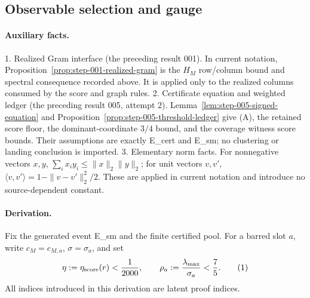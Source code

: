 \subsection{Observable selection and gauge}\label{app:step-006}

\paragraph{Auxiliary facts.}

1. Realized Gram interface (the preceding result 001). In current notation,
   Proposition~\ref{prop:step-001-realized-gram} is the \(H_M\) row/column
   bound and spectral consequence recorded above. It is applied only to the
   realized columns consumed by the score and graph rules.
2. Certificate equation and weighted ledger (the preceding result 005, attempt 2).
   Lemma~\ref{lem:step-005-signed-equation} and
   Proposition~\ref{prop:step-005-threshold-ledger} give (A), the retained
   score floor, the dominant-coordinate \(3/4\) bound, and the coverage
   witness score bounds. Their assumptions are exactly E\_cert and E\_sm; no
   clustering or landing conclusion is imported.
3. Elementary norm facts. For nonnegative vectors \(x,y\),
   \(\sum_i x_i y_i\le\|x\|_2\|y\|_2\); for unit vectors \(v,v'\),
   \(\langle v,v'\rangle=1-\|v-v'\|_2^2/2\). These are applied in current
   notation and introduce no source-dependent constant.

\paragraph{Derivation.}

Fix the generated event E\_sm and the finite certified pool. For a barred slot
\(a\), write \(c_M=c_{M,a}\), \(\sigma=\sigma_a\), and set
\[
 \eta:=\eta_{\rm score}(r)<{1\over2000},\qquad
 \rho_a:={\lambda_{\max}\over\sigma_a}<{7\over5}. \tag{1}
\]
All indices introduced in this derivation are latent proof indices.


